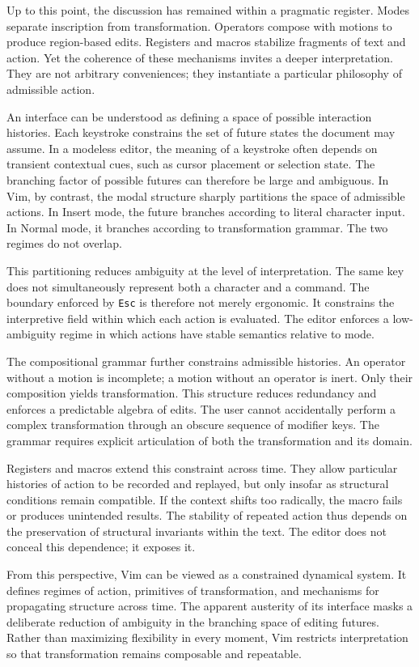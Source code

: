 \documentclass[12pt]{article}
\begin{document}
Up to this point, the discussion has remained within a pragmatic register. Modes separate inscription from transformation. Operators compose with motions to produce region-based edits. Registers and macros stabilize fragments of text and action. Yet the coherence of these mechanisms invites a deeper interpretation. They are not arbitrary conveniences; they instantiate a particular philosophy of admissible action.

An interface can be understood as defining a space of possible interaction histories. Each keystroke constrains the set of future states the document may assume. In a modeless editor, the meaning of a keystroke often depends on transient contextual cues, such as cursor placement or selection state. The branching factor of possible futures can therefore be large and ambiguous. In Vim, by contrast, the modal structure sharply partitions the space of admissible actions. In Insert mode, the future branches according to literal character input. In Normal mode, it branches according to transformation grammar. The two regimes do not overlap.

This partitioning reduces ambiguity at the level of interpretation. The same key does not simultaneously represent both a character and a command. The boundary enforced by \texttt{Esc} is therefore not merely ergonomic. It constrains the interpretive field within which each action is evaluated. The editor enforces a low-ambiguity regime in which actions have stable semantics relative to mode.

The compositional grammar further constrains admissible histories. An operator without a motion is incomplete; a motion without an operator is inert. Only their composition yields transformation. This structure reduces redundancy and enforces a predictable algebra of edits. The user cannot accidentally perform a complex transformation through an obscure sequence of modifier keys. The grammar requires explicit articulation of both the transformation and its domain.

Registers and macros extend this constraint across time. They allow particular histories of action to be recorded and replayed, but only insofar as structural conditions remain compatible. If the context shifts too radically, the macro fails or produces unintended results. The stability of repeated action thus depends on the preservation of structural invariants within the text. The editor does not conceal this dependence; it exposes it.

From this perspective, Vim can be viewed as a constrained dynamical system. It defines regimes of action, primitives of transformation, and mechanisms for propagating structure across time. The apparent austerity of its interface masks a deliberate reduction of ambiguity in the branching space of editing futures. Rather than maximizing flexibility in every moment, Vim restricts interpretation so that transformation remains composable and repeatable.
\end{document}
